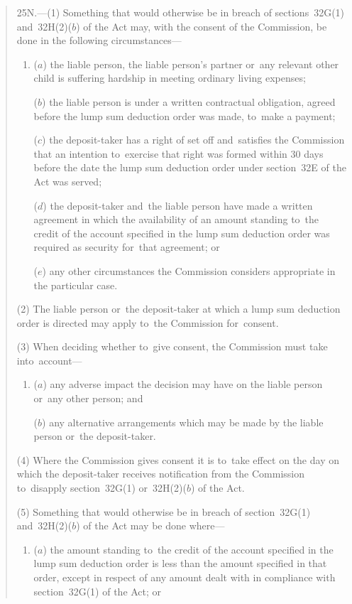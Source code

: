 \documentclass[12pt,a4paper]{article}
\begin{document}
\begin{quotation}
25N.---(1)  Something that would otherwise be in breach of sections~32G(1) and~32H(2)($b$)  of the Act may, with the consent of the Commission, be done in the following circumstances—
\begin{enumerate}\item[]
($a$) the liable person, the liable person’s partner or~any relevant other child is suffering hardship in meeting ordinary living expenses;

($b$) the liable person is under a written contractual obligation, agreed before the lump sum deduction order was made, to~make a payment;

($c$) the deposit-taker has a right of set off and~satisfies the Commission that an intention to~exercise that right was formed within 30 days before the date the lump sum deduction order under section~32E of the Act was served;

($d$) the deposit-taker and~the liable person have made a written agreement in which the availability of an amount standing to~the credit of the account specified in the lump sum deduction order was required as security for~that agreement; or

($e$) any other circumstances the Commission considers appropriate in the particular case.
\end{enumerate}

(2) The liable person or~the deposit-taker at which a lump sum deduction order is directed may apply to~the Commission for~consent.

(3) When deciding whether to~give consent, the Commission must take into~account—
\begin{enumerate}\item[]
($a$) any adverse impact the decision may have on the liable person or~any other person; and

($b$) any alternative arrangements which may be made by the liable person or~the deposit-taker.
\end{enumerate}

(4) Where the Commission gives consent it is to~take effect on the day on which the deposit-taker receives notification from the Commission to~disapply section~32G(1) or~32H(2)($b$)  of the Act.

(5) Something that would otherwise be in breach of section~32G(1) and~32H(2)($b$)  of the Act may be done where—
\begin{enumerate}\item[]
($a$) the amount standing to~the credit of the account specified in the lump sum deduction order is less than the amount specified in that order, except in respect of any amount dealt with in compliance with section~32G(1) of the Act; or


\end{enumerate}
\end{quotation}
\end{document}
